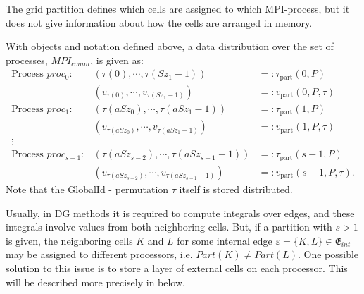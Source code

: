 \begin{myRem}
The grid partition defines which cells are assigned to which MPI-process, but it
does not give information about how the cells are arranged in memory.
\end{myRem}

\begin{myRem}
With objects and notation defined above,
a data distribution over the set of processes, $MPI_{comm}$, is given as:
\begin{eqnarray*}
  \textrm{Process } proc_0:     & \left( \tau(0), \cdots, \tau(Sz_1 - 1) \right)                          & =: \tau_\textrm{part}(0,P)         \\
                                & \left(v_{\tau(0)},\cdots,v_{\tau(Sz_1-1)} \right)                         & =: v_\textrm{part}(0,P,\tau) \\
  \textrm{Process } proc_1:     & \left( \tau(aSz_0), \cdots, \tau(aSz_1 - 1) \right)              & =: \tau_\textrm{part}(1,P)         \\
                                & \left(v_{\tau(aSz_0)},\cdots,v_{\tau(aSz_1 -1)} \right)         & =: v_\textrm{part}(1,P,\tau) \\
  \vdots  &  &\\
  \textrm{Process } proc_{s-1}: & \left( \tau(aSz_{s-2}), \cdots, \tau(aSz_{s-1}-1) \right)      & =: \tau_\textrm{part}(s-1,P)         \\
                                & \left(v_{\tau(aSz_{s-2})},\cdots,v_{\tau(aSz_{s-1}-1)} \right) & =: v_\textrm{part}(s-1,P,\tau).
\end{eqnarray*}
Note that the GlobalId - permutation $\tau$ itself is stored distributed.
\end{myRem}

\begin{myRem}
Usually, in DG methods it is required to compute integrals over edges, and these integrals
involve values from both neighboring cells.
But, if a partition with $s > 1$ is given, the
neighboring cells $K$ and $L$ for
some internal edge $\varepsilon = \{K,L\} \in \mathfrak{E}_{int}$
may be assigned to different processors, i.e. $Part(K) \neq Part(L)$.
One possible solution to this issue is to store a layer of external cells on each processor.
This will be described more precisely in below.
\end{myRem}

